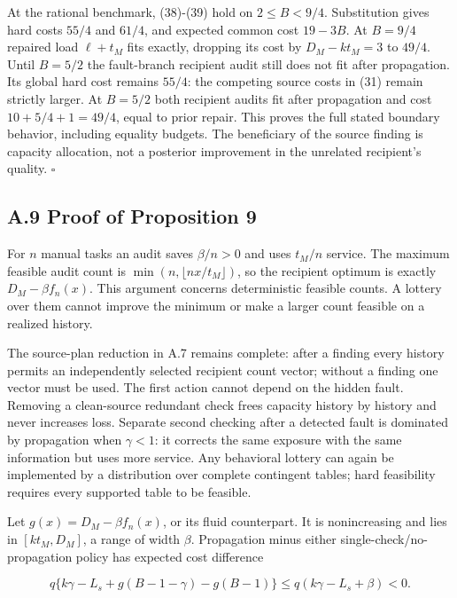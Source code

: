 \documentclass[
  11pt,
  a4paper,
]{article}
\begin{document}
At the rational benchmark, (38)-(39) hold on \(2\leq B<9/4\).
Substitution gives hard costs \(55/4\) and \(61/4\), and expected common
cost \(19-3B\). At \(B=9/4\) repaired load \(\ell+t_M\) fits exactly,
dropping its cost by \(D_M-kt_M=3\) to \(49/4\). Until \(B=5/2\) the
fault-branch recipient audit still does not fit after propagation. Its
global hard cost remains \(55/4\): the competing source costs in (31)
remain strictly larger. At \(B=5/2\) both recipient audits fit after
propagation and cost \(10+5/4+1=49/4\), equal to prior repair. This
proves the full stated boundary behavior, including equality budgets.
The beneficiary of the source finding is capacity allocation, not a
posterior improvement in the unrelated recipient's quality. \(\square\)

\hypertarget{a.9-proof-of-proposition-9}{%
\subsection{A.9 Proof of Proposition
9}\label{a.9-proof-of-proposition-9}}

For \(n\) manual tasks an audit saves \(\beta/n>0\) and uses \(t_M/n\)
service. The maximum feasible audit count is
\(\min(n,\lfloor nx/t_M\rfloor)\), so the recipient optimum is exactly
\(D_M-\beta f_n(x)\). This argument concerns deterministic feasible
counts. A lottery over them cannot improve the minimum or make a larger
count feasible on a realized history.

The source-plan reduction in A.7 remains complete: after a finding every
history permits an independently selected recipient count vector;
without a finding one vector must be used. The first action cannot
depend on the hidden fault. Removing a clean-source redundant check
frees capacity history by history and never increases loss. Separate
second checking after a detected fault is dominated by propagation when
\(\gamma<1\): it corrects the same exposure with the same information
but uses more service. Any behavioral lottery can again be implemented
by a distribution over complete contingent tables; hard feasibility
requires every supported table to be feasible.

Let \(g(x)=D_M-\beta f_n(x)\), or its fluid counterpart. It is
nonincreasing and lies in \([kt_M,D_M]\), a range of width \(\beta\).
Propagation minus either single-check/no-propagation policy has expected
cost difference

\[q\{k\gamma-L_s+g(B-1-\gamma)-g(B-1)\}
\leq q(k\gamma-L_s+\beta)<0.\]
\end{document}
